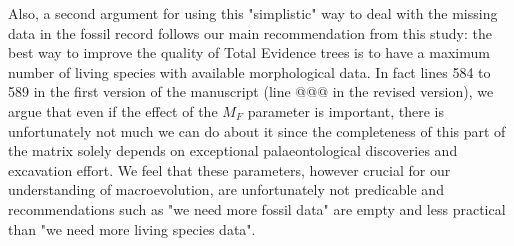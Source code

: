 \documentclass[12pt,letterpaper]{article}
\begin{document}
\begin{enumerate}
Also, a second argument for using this "simplistic" way to deal with the missing data in the fossil record follows our main recommendation from this study: the best way to improve the quality of Total Evidence trees is to have a maximum number of living species with available morphological data.
In fact lines 584 to 589 in the first version of the manuscript (line @@@ in the revised version), we argue that even if the effect of the $M_F$ parameter is important, there is unfortunately not much we can do about it since the completeness of this part of the matrix solely depends on exceptional palaeontological discoveries and excavation effort.
We feel that these parameters, however crucial for our understanding of macroevolution, are unfortunately not predicable and recommendations such as "we need more fossil data" are empty and less practical than "we need more living species data".

\end{enumerate}
\end{document}

